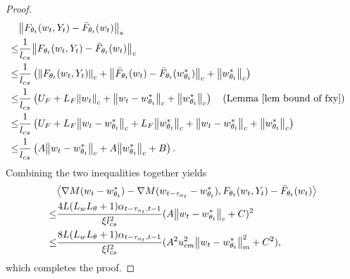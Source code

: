 \documentclass[twoside,11pt]{article}
\newcommand{\indot}[2]{{\left<#1, #2\right>}}
\numberwithin{assucounter}{section}
\begin{document}
\begin{proof}
\begin{align}
  &\norm{F_{\theta_t}(w_t, Y_t) - \bar F_{\theta_t}(w_t)}_s \\
  \leq& \frac{1}{l_{cs}}\norm{F_{\theta_t}(w_t, Y_t) - \bar F_{\theta_t}(w_t)}_c \\
  \leq& \frac{1}{l_{cs}}\left(\norm{F_{\theta_t}(w_t, Y_t)}_c + \norm{\bar F_{\theta_t}(w_t) - \bar F_{\theta_t}(w^*_{\theta_t})}_c + \norm{w^*_{\theta_t}}_c \right)\\
  \leq&\frac{1}{l_{cs}}  \left( U_F + L_F \norm{w_t}_c + \norm{w_t - w^*_{\theta_t}}_c + \norm{w^*_{\theta_t}}_c \right) \qq{(Lemma~\ref{lem bound of fxy})} \\
  \leq&\frac{1}{l_{cs}} \left( U_F + L_F \norm{w_t - w^*_{\theta_t}}_c + L_F \norm{w^*_{\theta_t}}_c +  \norm{w_t - w^*_{\theta_t}}_c + \norm{w^*_{\theta_t}}_c \right) \\
  \leq&\frac{1}{l_{cs}} \left(A\norm{w_t - w^*_{\theta_t}}_c + A \norm{w^*_{\theta_t}}_c + B\right).
\end{align}
Combining the two inequalities together yields
\begin{align}
  &\indot{\nabla M(w_t - w^*_{\theta_t}) - \nabla M(w_{t-\tau_{\alpha_t}} - w^*_{\theta_t})}{F_{\theta_t}(w_t, Y_t) - \bar F_{\theta_t}(w_t)} \\
  \leq& \frac{4L (L_wL_\theta + 1)  \alpha_{t-\tau_{\alpha_t}, t-1}}{\xi l_{cs}^2} (A\norm{w_t - w^*_{\theta_t}}_c + C)^2 \\
  \leq& \frac{8L (L_wL_\theta + 1)  \alpha_{t-\tau_{\alpha_t}, t-1}}{\xi l_{cs}^2} (A^2 u_{cm}^2\norm{w_t - w^*_{\theta_t}}_m^2 + C^2),
\end{align}
which completes the proof.
\end{proof}
\end{document}
